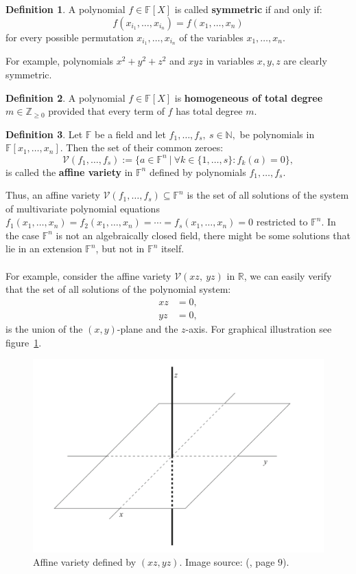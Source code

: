 \documentclass[thesis=M,english]{FITthesis}[2012/10/20]
\theoremstyle{remark}
\theoremstyle{definition}
\newtheorem{DF}{Definition}[section]
\begin{document}
\begin{DF}
A polynomial $f \in \mathbb{F}[X]$ is called \textbf{symmetric} if and only if:
$$
f(x_{i_1}, \ldots, x_{i_n}) = f(x_1, \ldots, x_n)
$$
for every possible permutation $x_{i_1}, \ldots, x_{i_n}$ of the variables $x_1, \ldots, x_n$.
\end{DF}
\noindent For example, polynomials $x^2+y^2+z^2$ and $xyz$ in variables $x,y,z$ are clearly symmetric.
\begin{DF}
A polynomial $f \in \mathbb{F}[X]$ is \textbf{homogeneous of total degree} $m \in \mathbb{Z}_{\geq 0}$ provided that every term of $f$ has total degree $m$.
\end{DF}
\begin{DF}
Let $\mathbb{F}$ be a field and let $f_1, \ldots, f_s,\ s \in \mathbb{N},$ be polynomials in $\mathbb{F}[x_1,\ldots, x_n].$ Then the set of their common zeroes:
$$
\mathcal{V}(f_1, \ldots, f_s) := \{a \in \mathbb{F}^n\ |\ \forall k \in \{1,\ldots,s\}: f_k(a) =  0\},
$$
is called the \textbf{affine variety} in $\mathbb{F}^n$ defined by polynomials $f_1, \ldots, f_s$.
\end{DF}
\noindent Thus, an affine variety $\mathcal{V}(f_1, \ldots, f_s) \subseteq \mathbb{F}^n$ is the set of all solutions of the system of multivariate polynomial equations $f_1(x_1,\ldots,x_n) = f_2(x_1,\ldots,x_n) = \cdots = f_s(x_1,\ldots,x_n) = 0$ restricted to $\mathbb{F}^n$. In the case $\mathbb{F}^n$ is not an algebraically closed field, there might be some solutions that lie in an extension $\mathbb{F}^n$, but not in $\mathbb{F}^n$ itself.\\ \\
\noindent For example, consider the affine variety $\mathcal{V}(xz,\ yz)$ in $\mathbb{R}$, we can easily verify that the set of all solutions of the polynomial system:
\begin{align*}
xz &= 0, \\
yz& = 0,
\end{align*}
is the union of the $(x,y)$-plane and the $z$-axis. For graphical illustration see figure~\ref{fig1}.
 \begin{figure}[h]
 \centering
 	\includegraphics[width=1.0\textwidth]{affineVariety.png}
 	\caption[Example of an affine variety]{Affine variety defined by $(xz,yz)$. Image source: (\cite{algGeom}, page $9$).}
 	\label{fig1}
 \end{figure}
\end{document}
